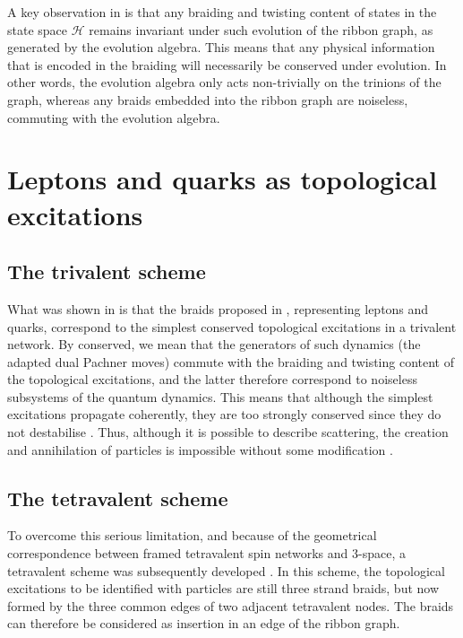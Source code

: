 \documentclass[aps,nofootinbib,amsfonts,superscriptaddress]{revtex4}
\begin{document}
A key observation in \cite{BT2} is that any braiding and twisting content of states in the state space $\mathcal{H}$ remains invariant under such evolution of the ribbon graph, as generated by the evolution algebra. This means that any physical information that is encoded in the braiding will necessarily be conserved under evolution. In other words, the evolution algebra only acts non-trivially on the trinions of the graph, whereas any braids embedded into the ribbon graph are noiseless, commuting with the evolution algebra. 

\section{Leptons and quarks as topological excitations}

\subsection{The trivalent scheme}

What was shown in \cite{BT2} is that the braids proposed in \cite{BT}, representing leptons and quarks, correspond to the simplest conserved topological excitations in a trivalent network. By conserved, we mean that the generators of such dynamics (the adapted dual Pachner moves) commute with the braiding and twisting content of the topological excitations, and the latter therefore correspond to noiseless subsystems of the quantum dynamics. This means that although the simplest excitations propagate coherently, they are too strongly conserved since they do not destabilise \cite{BT2}. Thus, although it is possible to describe scattering, the creation and annihilation of particles is impossible  without some  modification \cite{JH}.

\subsection{The tetravalent scheme}

To overcome this serious limitation, and because of the geometrical correspondence between framed tetravalent spin networks and 3-space, a tetravalent scheme was subsequently developed \cite{YW,SW}. In this scheme, the topological excitations to be identified with particles are still three strand braids, but now formed by the three common edges of two adjacent tetravalent nodes. The braids can therefore be considered as insertion in an edge of the ribbon graph. %
\\
\end{document}
